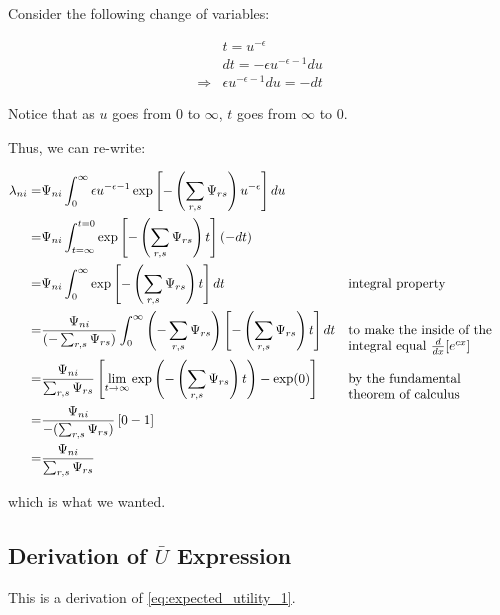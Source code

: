 \documentclass[10pt]{article}
\begin{document}
Consider the following change of variables:

\begin{align}
    &t = u^{-\epsilon} \\
    &dt = -\epsilon u^{-\epsilon-1} du \\
    \Rightarrow &\epsilon u^{-\epsilon-1} d u=-d t
\end{align}

Notice that as $u$ goes from 0 to $\infty$, $t$ goes from $\infty$ to 0.

Thus, we can re-write:

\begin{align}
    \lambda_{ni} = &\Psi_{n i} \int_0^{\infty} \epsilon u^{-\epsilon-1} \exp \left[-\left(\sum_{r, s} \Psi_{r s}\right) u^{-\epsilon}\right] d u \\
    = &\Psi_{n i} \int_{t=\infty}^{t=0} \exp \left[- \left(\sum_{r, s} \Psi_{r s}\right) t\right](-d t)  \\
    = & \Psi_{n i} \int_{0}^{\infty} \exp \left[- \left(\sum_{r, s} \Psi_{r s}\right) t\right] d t && \parbox[t]{4cm}{\raggedright integral property} \\
    = & \frac{\Psi_{n i}}{(-\sum_{r, s} \Psi_{r s})} \int_{0}^\infty \left(-\sum_{r, s} \Psi_{r s}\right) \left[-\left(\sum_{r, s} \Psi_{r s}\right) t\right] d t && \parbox[t]{4cm}{\raggedright to make the inside of the integral equal $\frac{d}{dx}[e^{cx}]$} \\
    = & \frac{\Psi_{n i}}{\sum_{r, s} \Psi_{r s}} \left[ \lim_{t \to \infty} \exp\left(-\left(\sum_{r, s} \Psi_{r s}\right) t\right) - \exp(0)\right] && \parbox[t]{4cm}{\raggedright by the fundamental theorem of calculus} \\
    = & \frac{\Psi_{n i}}{-(\sum_{r, s} \Psi_{r s})} \left[0 - 1\right] \\
    = & \frac{\Psi_{n i}}{\sum_{r, s} \Psi_{r s}}
\end{align}

which is what we wanted.


\subsection{Derivation of $\bar{U}$ Expression}
\label{sec:expected_utility_1}

This is a derivation of \eqref{eq:expected_utility_1}.
\end{document}
